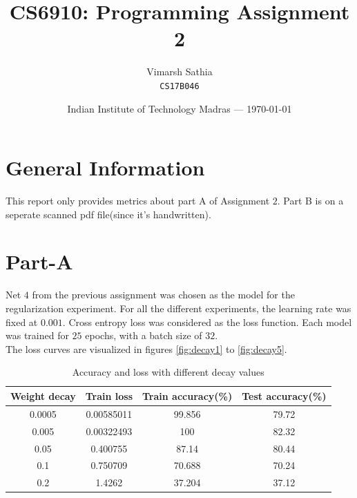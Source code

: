 \documentclass{article}
\title{CS6910: Programming Assignment 2} %
\author{Vimarsh Sathia\\ \texttt{CS17B046}} %
\date{Indian Institute of Technology Madras --- \today} %
\begin{document}
\maketitle %

\section*{General Information}
This report only provides metrics about part A of Assignment $2$. Part B is on a seperate scanned pdf file(since it's handwritten).
\section*{Part-A}
Net $4$ from the previous assignment was chosen as the model for the regularization experiment. For all the different experiments, the learning rate was fixed at $0.001$. Cross entropy loss was considered as the loss function. Each model was trained for $25$ epochs, with a batch size of $32$.\\
The loss curves are visualized in figures \cref{fig:decay1} to \cref{fig:decay5}.
\begin{table}[ht]
	\caption{Accuracy and loss with different decay values}%
	\centering %
	\begin{tabular}{|c | c | c | c|}%
		\hline\hline      
		Weight decay & Train loss & Train accuracy(\%) & Test accuracy(\%) \\ [0.5ex]
		\hline  
         0.0005 &   0.00585011 &             99.856 &              79.72 \\
         0.005  &   0.00322493 &            100     &              82.32 \\
         0.05   &   0.400755   &             87.14  &              80.44 \\
		 0.1    &   0.750709   &             70.688 &              70.24 \\
	     0.2 &      1.4262     &             37.204 &              37.12 \\ [1ex]
		\hline
	\end{tabular}
	\label{table:test-acc}%
\end{table}
\end{document}
